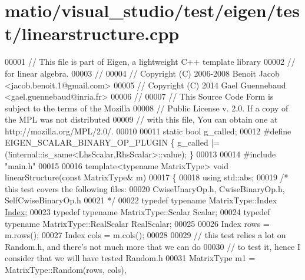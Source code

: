 \hypertarget{matio_2visual__studio_2test_2eigen_2test_2linearstructure_8cpp_source}{}\section{matio/visual\+\_\+studio/test/eigen/test/linearstructure.cpp}
\label{matio_2visual__studio_2test_2eigen_2test_2linearstructure_8cpp_source}

\begin{DoxyCode}
00001 \textcolor{comment}{// This file is part of Eigen, a lightweight C++ template library}
00002 \textcolor{comment}{// for linear algebra.}
00003 \textcolor{comment}{//}
00004 \textcolor{comment}{// Copyright (C) 2006-2008 Benoit Jacob <jacob.benoit.1@gmail.com>}
00005 \textcolor{comment}{// Copyright (C) 2014 Gael Guennebaud <gael.guennebaud@inria.fr>}
00006 \textcolor{comment}{//}
00007 \textcolor{comment}{// This Source Code Form is subject to the terms of the Mozilla}
00008 \textcolor{comment}{// Public License v. 2.0. If a copy of the MPL was not distributed}
00009 \textcolor{comment}{// with this file, You can obtain one at http://mozilla.org/MPL/2.0/.}
00010 
00011 \textcolor{keyword}{static} \textcolor{keywordtype}{bool} g\_called;
00012 \textcolor{preprocessor}{#define EIGEN\_SCALAR\_BINARY\_OP\_PLUGIN \{ g\_called |= (!internal::is\_same<LhsScalar,RhsScalar>::value); \}}
00013 
00014 \textcolor{preprocessor}{#include "main.h"}
00015 
00016 \textcolor{keyword}{template}<\textcolor{keyword}{typename} MatrixType> \textcolor{keywordtype}{void} linearStructure(\textcolor{keyword}{const} MatrixType& m)
00017 \{
00018   \textcolor{keyword}{using} std::abs;
00019   \textcolor{comment}{/* this test covers the following files:}
00020 \textcolor{comment}{     CwiseUnaryOp.h, CwiseBinaryOp.h, SelfCwiseBinaryOp.h }
00021 \textcolor{comment}{  */}
00022   \textcolor{keyword}{typedef} \textcolor{keyword}{typename} MatrixType::Index \hyperlink{namespace_eigen_a62e77e0933482dafde8fe197d9a2cfde}{Index};
00023   \textcolor{keyword}{typedef} \textcolor{keyword}{typename} MatrixType::Scalar Scalar;
00024   \textcolor{keyword}{typedef} \textcolor{keyword}{typename} MatrixType::RealScalar RealScalar;
00025 
00026   Index rows = m.rows();
00027   Index cols = m.cols();
00028 
00029   \textcolor{comment}{// this test relies a lot on Random.h, and there's not much more that we can do}
00030   \textcolor{comment}{// to test it, hence I consider that we will have tested Random.h}
00031   MatrixType m1 = MatrixType::Random(rows, cols),

\end{DoxyCode}
